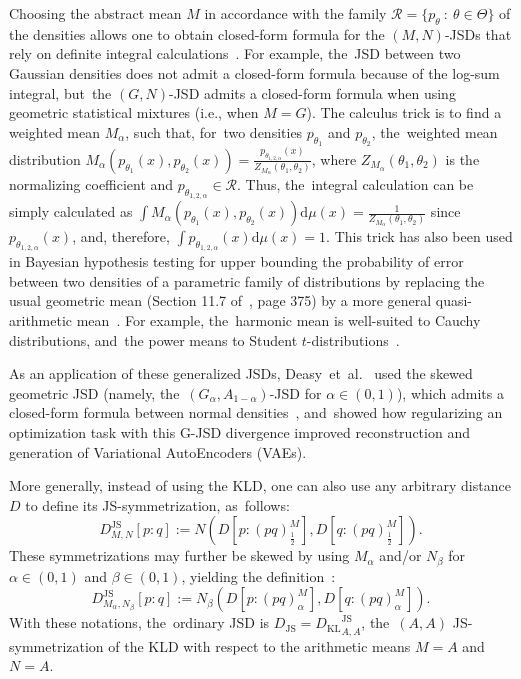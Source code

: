 \documentclass[entropy,article,accept,oneauthor,pdftex,entropy]{Definitions/mdpi}
\def\JS{\mathrm{JS}}
\def\KL{\mathrm{KL}}
\def\dmu{\mathrm{d}\mu}
\def\calR{\mathcal{R}}
\def\dmu{\mathrm{d}\mu}
\begin{document}
Choosing the abstract mean $M$ in accordance with the family $\calR=\{p_\theta\ :\ \theta\in\Theta\}$ of the densities allows one to obtain closed-form formula for the $(M,N)$-JSDs that rely on definite integral calculations~\cite{JSsym-2019}.
For example, the~JSD between two Gaussian densities does not admit a closed-form formula because of the log-sum integral, but~the $(G,N)$-JSD admits a closed-form formula when using geometric statistical mixtures (i.e., when $M=G$).
The calculus trick is to find a weighted mean $M_\alpha$, such that, for~two densities $p_{\theta_1}$ and $p_{\theta_2}$, the~weighted mean distribution
 $M_\alpha(p_{\theta_1}(x),p_{\theta_2}(x))= \frac{p_{\theta_{1,2,\alpha}}(x)}{Z_{M_\alpha}(\theta_1,\theta_2)}$, where $Z_{M_\alpha}(\theta_1,\theta_2)$ is the normalizing coefficient and $p_{\theta_{1,2,\alpha}}\in\calR$. 
Thus, the~integral calculation can be simply calculated as
 $\int M_\alpha(p_{\theta_1}(x),p_{\theta_2}(x)) \dmu(x)=\frac{1}{Z_{M_\alpha}(\theta_1,\theta_2)}$ since $p_{\theta_{1,2,\alpha}}(x)$, and, therefore, $\int p_{\theta_{1,2,\alpha}}(x) \dmu(x)=1$.
This trick has also been used in Bayesian hypothesis testing for upper bounding the probability of error between two densities of a parametric family of distributions  by replacing the usual geometric mean (Section 11.7 of~\cite{CoverThomasIT-2012}, page 375) by a more general quasi-arithmetic mean~\cite{GenBhat-2014}.
For example, the~harmonic mean is well-suited to Cauchy distributions, and~the power means to Student $t$-distributions~\cite{GenBhat-2014}.

As an application of these generalized JSDs, Deasy~et~al.~\cite{VIGJSD-2020} used the skewed geometric JSD (namely, the~$(G_\alpha,A_{1-\alpha})$-JSD for $\alpha\in(0,1)$), which admits  a closed-form formula between normal densities~\cite{JSsym-2019}, and~showed how regularizing an optimization task with this G-JSD divergence improved reconstruction and generation of Variational AutoEncoders (VAEs).

More generally, instead of using the KLD, one can also use any arbitrary distance $D$ to define its JS-symmetrization, as~follows:
\begin{equation}\label{eq:genmnjsd}
D^\JS_{M,N}[p:q] :=   N\left( D\left[p:(pq)^M_{\frac{1}{2}}\right], D\left[q:(pq)^M_{\frac{1}{2}}\right]\right).
\end{equation}
These symmetrizations may further be skewed by using $M_\alpha$ and/or $N_\beta$ for $\alpha\in (0,1)$ and $\beta\in(0,1)$, yielding the definition~\cite{JSsym-2019}:
\begin{equation}\label{eq:skewgenmnjsd}
D^\JS_{M_\alpha,N_\beta}[p:q] :=   N_\beta\left( D\left[p:(pq)^M_{\alpha}\right], D\left[q:(pq)^M_{\alpha}\right]\right).
\end{equation}
With these notations, the~ordinary JSD is $D_\JS={D_\KL}^\JS_{A,A}$, the~$(A,A)$ JS-symmetrization of the KLD with respect to the arithmetic means $M=A$ and $N=A$.
\end{document}
